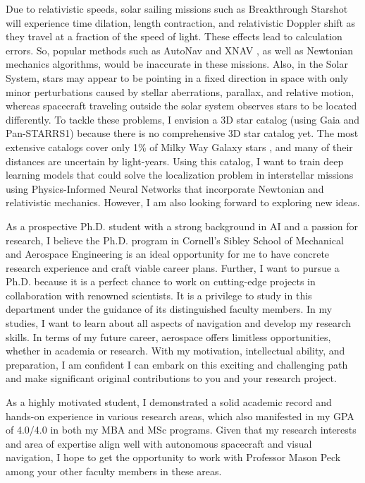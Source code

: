 \documentclass[a4,25pt]{article}
\begin{document}
\begin{large}
Due to relativistic speeds, solar sailing missions such as Breakthrough Starshot will experience time dilation, length contraction, and relativistic Doppler shift as they travel at a fraction of the speed of light. These effects lead to calculation errors. So, popular methods such as AutoNav \cite{team2000autonomous} and XNAV \cite{graven2008xnav}, as well as Newtonian mechanics algorithms, would be inaccurate in these missions. Also, in the Solar System, stars may appear to be pointing in a fixed direction in space with only minor perturbations caused by stellar aberrations, parallax, and relative motion, whereas spacecraft traveling outside the solar system observes stars to be located differently. To tackle these problems, I envision a 3D star catalog (using Gaia and Pan-STARRS1) because there is no comprehensive 3D star catalog yet. The most extensive catalogs cover only 1\% of Milky Way Galaxy stars \cite{mckee2022navigation}, and many of their distances are uncertain by light-years. Using this catalog, I want to train deep learning models that could solve the localization problem in interstellar missions using Physics-Informed Neural Networks that incorporate Newtonian and relativistic mechanics. However, I am also looking forward to exploring new ideas. \par
\vspace{-0.25cm}\quad As a prospective Ph.D. student with a strong background in AI and a passion for research, I believe the Ph.D. program in Cornell’s Sibley School of Mechanical and Aerospace Engineering is an ideal opportunity for me to have concrete research experience and craft viable career plans. Further, I want to pursue a Ph.D. because it is a perfect chance to work on cutting-edge projects in collaboration with renowned scientists. It is a privilege to study in this department under the guidance of its distinguished faculty members. In my studies, I want to learn about all aspects of navigation and develop my research skills. In terms of my future career, aerospace offers limitless opportunities, whether in academia or research. With my motivation, intellectual ability, and preparation, I am confident I can embark on this exciting and challenging path and make significant original contributions to you and your research project.\par
\vspace{-0.25cm} \quad As a highly motivated student, I demonstrated a solid academic record and hands-on experience in various research areas, which also manifested in my GPA of 4.0/4.0 in both my MBA and MSc programs. Given that my research interests and area of expertise align well with autonomous spacecraft and visual navigation, I hope to get the opportunity to work with Professor Mason Peck among your other faculty members in these areas. \par

\end{large}
\end{document}
